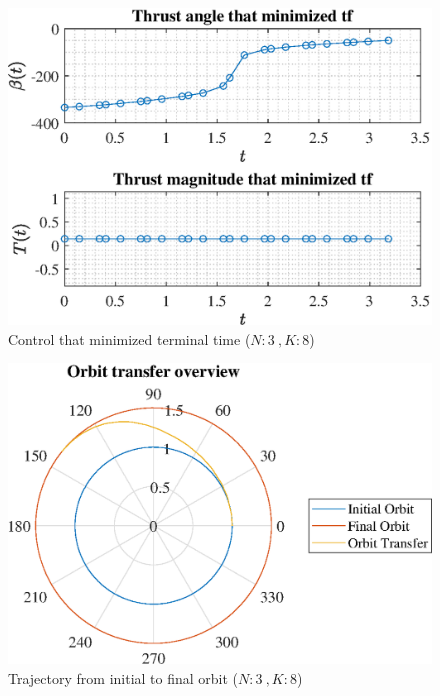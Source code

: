 \documentclass[]{article}
\begin{document}
	\begin{figure}
		\centering
		\includegraphics[scale=0.75]{control_N3_K8_C2_tf.eps}
		\caption{Control that minimized terminal time (\(N:3\ , K:8\))}
		\label{fig:control_N3_K8_C2_tf}
	\end{figure}
	\begin{figure}
		\centering
		\includegraphics[scale=0.75]{orbit_N3_K8_C2_tf.eps}
		\caption{Trajectory from initial to final orbit (\(N:3\ , K:8\))}
		\label{fig:orbit_N3_K8_C2_tf}
	\end{figure}
\end{document}
